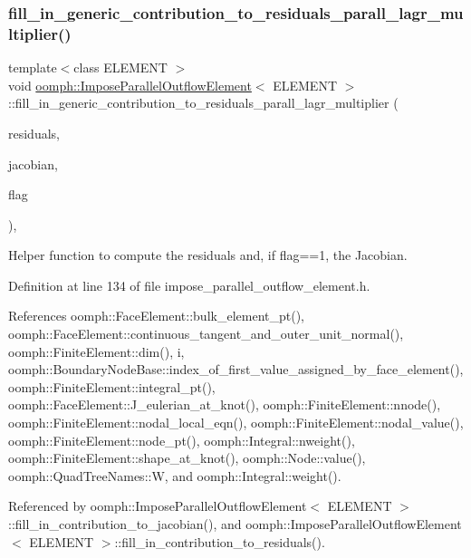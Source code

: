 \subsubsection{\texorpdfstring{fill\+\_\+in\+\_\+generic\+\_\+contribution\+\_\+to\+\_\+residuals\+\_\+parall\+\_\+lagr\+\_\+multiplier()}{fill\_in\_generic\_contribution\_to\_residuals\_parall\_lagr\_multiplier()}}
{\footnotesize\ttfamily template$<$class E\+L\+E\+M\+E\+NT $>$ \\
void \hyperlink{classoomph_1_1ImposeParallelOutflowElement}{oomph\+::\+Impose\+Parallel\+Outflow\+Element}$<$ E\+L\+E\+M\+E\+NT $>$\+::fill\+\_\+in\+\_\+generic\+\_\+contribution\+\_\+to\+\_\+residuals\+\_\+parall\+\_\+lagr\+\_\+multiplier (\begin{DoxyParamCaption}\item[{\hyperlink{classoomph_1_1Vector}{Vector}$<$ double $>$ \&}]{residuals,  }\item[{\hyperlink{classoomph_1_1DenseMatrix}{Dense\+Matrix}$<$ double $>$ \&}]{jacobian,  }\item[{const unsigned \&}]{flag }\end{DoxyParamCaption})\hspace{0.3cm}{\ttfamily [inline]}, {\ttfamily [protected]}}



Helper function to compute the residuals and, if flag==1, the Jacobian. 



Definition at line 134 of file impose\+\_\+parallel\+\_\+outflow\+\_\+element.\+h.



References oomph\+::\+Face\+Element\+::bulk\+\_\+element\+\_\+pt(), oomph\+::\+Face\+Element\+::continuous\+\_\+tangent\+\_\+and\+\_\+outer\+\_\+unit\+\_\+normal(), oomph\+::\+Finite\+Element\+::dim(), i, oomph\+::\+Boundary\+Node\+Base\+::index\+\_\+of\+\_\+first\+\_\+value\+\_\+assigned\+\_\+by\+\_\+face\+\_\+element(), oomph\+::\+Finite\+Element\+::integral\+\_\+pt(), oomph\+::\+Face\+Element\+::\+J\+\_\+eulerian\+\_\+at\+\_\+knot(), oomph\+::\+Finite\+Element\+::nnode(), oomph\+::\+Finite\+Element\+::nodal\+\_\+local\+\_\+eqn(), oomph\+::\+Finite\+Element\+::nodal\+\_\+value(), oomph\+::\+Finite\+Element\+::node\+\_\+pt(), oomph\+::\+Integral\+::nweight(), oomph\+::\+Finite\+Element\+::shape\+\_\+at\+\_\+knot(), oomph\+::\+Node\+::value(), oomph\+::\+Quad\+Tree\+Names\+::W, and oomph\+::\+Integral\+::weight().



Referenced by oomph\+::\+Impose\+Parallel\+Outflow\+Element$<$ E\+L\+E\+M\+E\+N\+T $>$\+::fill\+\_\+in\+\_\+contribution\+\_\+to\+\_\+jacobian(), and oomph\+::\+Impose\+Parallel\+Outflow\+Element$<$ E\+L\+E\+M\+E\+N\+T $>$\+::fill\+\_\+in\+\_\+contribution\+\_\+to\+\_\+residuals().

